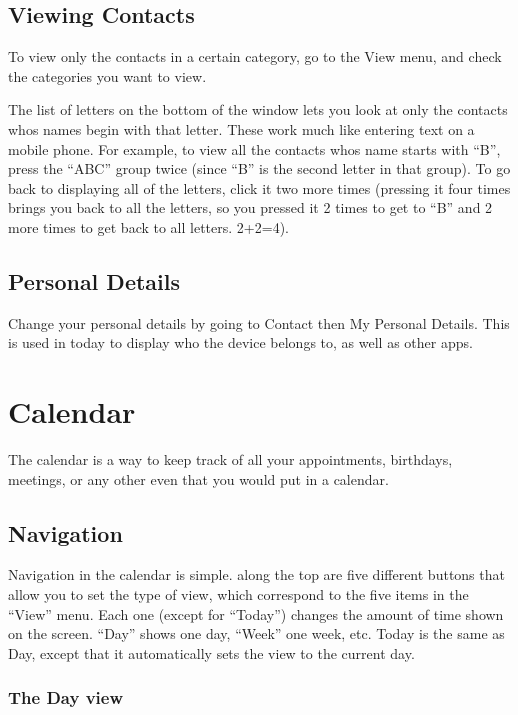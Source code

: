 \documentclass[12pt,letterpaper,oneside, openany]{book} \usepackage[latin1] {inputenc}
\begin{document}
\section{Viewing Contacts}

To view only the contacts in a certain category, go to the View menu, and check the categories you want to view. 

The list of letters on the bottom of the window lets you look at only the contacts whos names begin with that letter. These work much like entering text on a mobile phone. For example, to view all the contacts whos name starts with ``B'', press the ``ABC'' group twice (since ``B'' is the second letter in that group). To go back to displaying all of the letters, click it two more times (pressing it four times brings you back to all the letters, so you pressed it 2 times to get to ``B'' and 2 more times to get back to all letters. 2+2=4). 

\section{Personal Details}

Change your personal details by going to Contact then My Personal Details. This is used in today to display who the device belongs to, as well as other apps.

\chapter{Calendar}
The calendar is a way to keep track of all your appointments, birthdays, meetings, or any other even that you would put in a calendar.

\section{Navigation}

Navigation in the calendar is simple. along the top are five different buttons that allow you to set the type of view, which correspond to the five items in the ``View'' menu. Each one (except for ``Today'') changes the amount of time shown on the screen. ``Day'' shows one day, ``Week'' one week, etc. Today is the same as Day, except that it automatically sets the view to the current day. 

\subsection{The Day view}
\end{document}
